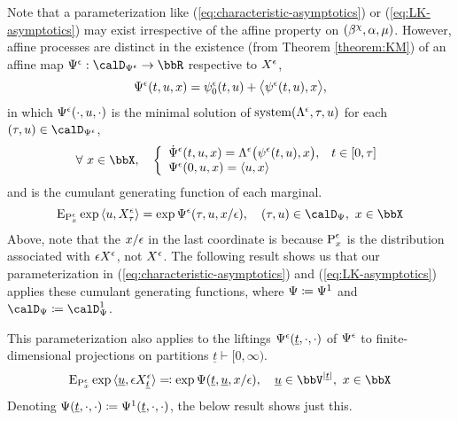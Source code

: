Note that a parameterization like (\ref{eq:characteristic-asymptotics}) or (\ref{eq:LK-asymptotics}) may exist irrespective of the affine property on $(\beta^\chi, \alpha, \mu)$.
However, affine processes are distinct in the existence (from Theorem \ref{theorem:KM}) of an affine map $\aff^\epsilon: \momentSpacee \rightarrow \bbR$ respective to $X^\epsilon$,
\begin{equation*}
  \Psi^\epsilon(t, u, x) = \psi^\epsilon_0(t,u) + {\big\langle \psi^\epsilon(t,u) , x \big\rangle},
\end{equation*}
in which $\Psi^\epsilon(\cdot, u, \cdot)$ is the minimal solution of $\operatorname{system}(\Lambda^\epsilon, \tau, u)$ for each $(\tau, \momentVar) \in \momentSpacee$,
\begin{equation*}
  \forall~ \stateVar \in \stateSpace, \quad \left\{\begin{array}{ll}
    \displaystyle \dot\aff^\epsilon(t, \momentVar, \stateVar) = \ode^\epsilon\big( \affPart^\epsilon(t, \momentVar), \stateVar \big), & t \in [0,\tau] \\
    \aff^\epsilon(0, \momentVar, \stateVar) = \prj{\momentVar}{\stateVar}
  \end{array}\right.
\end{equation*}
and is the cumulant generating function of each marginal.
\begin{equation*}
  \Exp_{\Prb^\epsilon_\stateVar} \exp\prj{\momentVar}{\Xee_\tau} = \exp\aff^\epsilon(\tau, \momentVar, \stateVar/\epsilon), \quad (\tau, \momentVar) \in \momentSpace, ~ \stateVar \in \stateSpace
\end{equation*}
Above, note that the $x/\epsilon$ in the last coordinate is because ${\operatorname{P}}^\epsilon_x$ is the distribution associated with $\epsilon X^\epsilon$, not $X^\epsilon$.
The following result shows us that our parameterization in (\ref{eq:characteristic-asymptotics}) and (\ref{eq:LK-asymptotics}) applies these cumulant generating functions, where $\Psi \coloneqq \Psi^1$ and $\momentSpace \defeq \momentSpace^1$.




This parameterization also applies to the liftings $\Psi^\epsilon(\underline t, \cdot, \cdot)$ of $\Psi^\epsilon$ to finite-dimensional projections on partitions $\underline t \vdash [0,\infty)$.
\begin{equation*}
  \Exp_{\Prb^\epsilon_\stateVar}\exp\prj{\underline\momentVar}{\Xe_{\underline t}} \eqdef \exp\aff(\underline t, \underline\momentVar, \stateVar/\epsilon), \quad \underline\momentVar \in \vecSpace^{|\underline t|}, ~ \stateVar\in \stateSpace
\end{equation*}
Denoting $\Psi(\underline t, \cdot, \cdot) \coloneqq \Psi^1(\underline t, \cdot, \cdot)$, the below result shows just this.

